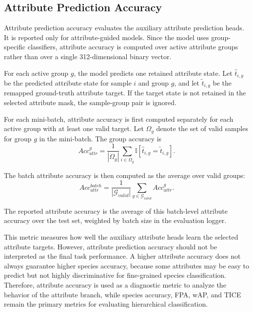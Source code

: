 \subsection{Attribute Prediction Accuracy}

Attribute prediction accuracy evaluates the auxiliary attribute prediction heads. It is reported only for attribute-guided models. Since the model uses group-specific classifiers, attribute accuracy is computed over active attribute groups rather than over a single 312-dimensional binary vector.

For each active group \(g\), the model predicts one retained attribute state. Let \(\hat{t}_{i,g}\) be the predicted attribute state for sample \(i\) and group \(g\), and let \(\tilde{t}_{i,g}\) be the remapped ground-truth attribute target. If the target state is not retained in the selected attribute mask, the sample-group pair is ignored.

For each mini-batch, attribute accuracy is first computed separately for each active group with at least one valid target. Let \(\Omega_g\) denote the set of valid samples for group \(g\) in the mini-batch. The group accuracy is
\begin{equation}
    Acc_{attr}^{g}
    =
    \frac{1}{|\Omega_g|}
    \sum_{i \in \Omega_g}
    \mathbb{I}
    \left[
        \hat{t}_{i,g}
        =
        \tilde{t}_{i,g}
    \right].
\end{equation}

The batch attribute accuracy is then computed as the average over valid groups:
\begin{equation}
    Acc_{attr}^{batch}
    =
    \frac{1}{|\mathcal{G}_{valid}|}
    \sum_{g \in \mathcal{G}_{valid}}
    Acc_{attr}^{g}.
\end{equation}

The reported attribute accuracy is the average of this batch-level attribute accuracy over the test set, weighted by batch size in the evaluation logger.

This metric measures how well the auxiliary attribute heads learn the selected attribute targets. However, attribute prediction accuracy should not be interpreted as the final task performance. A higher attribute accuracy does not always guarantee higher species accuracy, because some attributes may be easy to predict but not highly discriminative for fine-grained species classification. Therefore, attribute accuracy is used as a diagnostic metric to analyze the behavior of the attribute branch, while species accuracy, FPA, wAP, and TICE remain the primary metrics for evaluating hierarchical classification.






